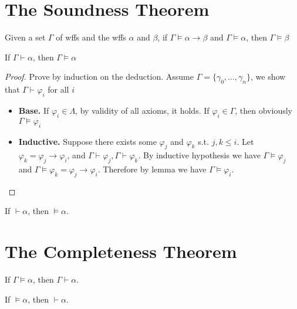\section{The Soundness Theorem}

\begin{lemma}
    Given a set $\Gamma$ of wffs and the wffs $\alpha$ and $\beta$, if $\Gamma\vDash\alpha\to\beta$ and $\Gamma\vDash\alpha$, then $\Gamma\vDash\beta$
\end{lemma}

\begin{theorem}
    \label{thm:SoundnessTheorem}
    If $\Gamma\vdash\alpha$, then $\Gamma\vDash\alpha$
\end{theorem}
\begin{proof}
    Prove by induction on the deduction. Assume $\Gamma=\{ \gamma_0,\dots,\gamma_n \}$, we show that $\Gamma\vdash\varphi_i$ for all $i$
    \begin{itemize}
        \item[] \textbf{Base.} If $\varphi_i \in \Lambda$, by validity of all axioms, it holds. If $\varphi_i \in \Gamma$, then obviously $\Gamma\vDash\varphi_i$
        \item[] \textbf{Inductive.} Suppose there exists some $\varphi_j$ and $\varphi_k$ s.t. $j,k \le i$. Let $\varphi_k = \varphi_j \to \varphi_i$, and $\Gamma\vdash\varphi_j, \Gamma\vdash\varphi_k$. By inductive hypothesis we have $\Gamma\vDash\varphi_j$ and $\Gamma\vDash\varphi_k=\varphi_j\to\varphi_i$. Therefore by lemma we have $\Gamma\vDash\varphi_i$. 
    \end{itemize}
\end{proof}

\begin{corollary}
    If $\vdash\alpha$, then $\vDash\alpha$.
\end{corollary}

\section{The Completeness Theorem}

\begin{theorem}
    If $\Gamma\vDash\alpha$, then $\Gamma\vdash\alpha$.
\end{theorem}

\begin{corollary}
    If $\vDash\alpha$, then $\vdash\alpha$.
\end{corollary}
